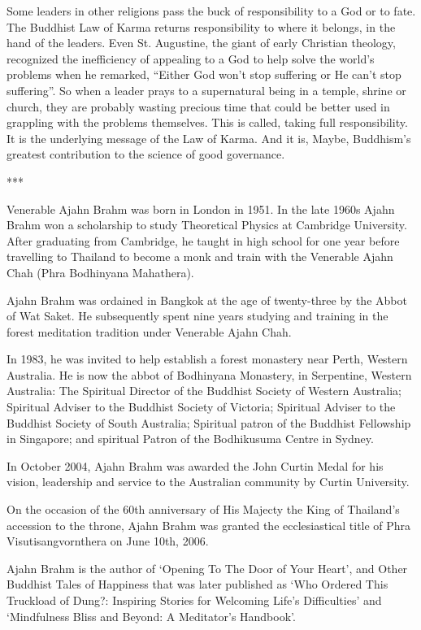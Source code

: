 \documentclass[12pt, openany]{book}
\begin{document}
Some leaders in other religions pass the buck of responsibility to a God or to fate. The Buddhist Law of Karma returns responsibility to where it belongs, in the hand of the leaders. Even St. Augustine, the giant of early Christian theology, recognized the inefficiency of appealing to a God to help solve the world’s problems when he remarked, “Either God won’t stop suffering or He can’t stop suffering”. So when a leader prays to a supernatural being in a temple, shrine or church, they are probably wasting precious time that could be better used in grappling with the problems themselves. This is called, taking full responsibility. It is the underlying message of the Law of Karma. And it is, Maybe, Buddhism’s greatest contribution to the science of good governance.


***


Venerable Ajahn Brahm was born in London in 1951. In the late 1960s Ajahn Brahm won a scholarship to study Theoretical Physics at Cambridge University. After graduating from Cambridge, he taught in high school for one year before travelling to Thailand to become a monk and train with the Venerable Ajahn Chah (Phra Bodhinyana Mahathera).

Ajahn Brahm was ordained in Bangkok at the age of twenty-three by the Abbot of Wat Saket. He subsequently spent nine years studying and training in the forest meditation tradition under Venerable Ajahn Chah.

In 1983, he was invited to help establish a forest monastery near Perth, Western Australia. He is now the abbot of Bodhinyana Monastery, in Serpentine, Western Australia: The Spiritual Director of the Buddhist Society of Western Australia; Spiritual Adviser to the Buddhist Society of Victoria; Spiritual Adviser to the Buddhist Society of South Australia; Spiritual patron of the Buddhist Fellowship in Singapore; and spiritual Patron of the Bodhikusuma Centre in Sydney.

In October 2004, Ajahn Brahm was awarded the John Curtin Medal for his vision, leadership and service to the Australian community by Curtin University.

On the occasion of the 60th anniversary of His Majecty the King of Thailand’s accession to the throne, Ajahn Brahm was granted the ecclesiastical title of Phra Visutisangvornthera on June 10th, 2006.

Ajahn Brahm is the author of ‘Opening To The Door of Your Heart’, and Other Buddhist Tales of Happiness that was later published as ‘Who Ordered This Truckload of Dung?: Inspiring Stories for Welcoming Life’s Difficulties’ and ‘Mindfulness Bliss and Beyond: A Meditator’s Handbook’.
\end{document}
